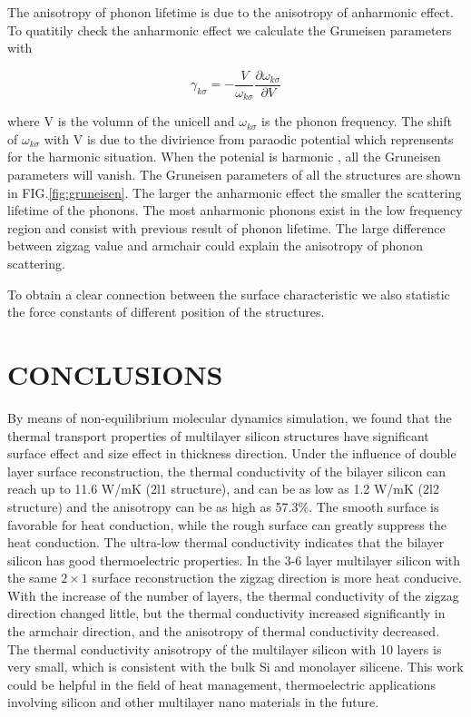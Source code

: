 \documentclass[%
 reprint,
 amsmath,amssymb,
 aps,
 prb,
]{revtex4-1}
\begin{document}
The anisotropy of phonon lifetime is due to the anisotropy of anharmonic effect. To quatitily check the anharmonic effect we calculate the Gruneisen parameters with

\begin{equation}
  \gamma_{k \sigma}=- \frac{V}{\omega_{k \sigma}} \frac{\partial \omega_{k \sigma}}{\partial V}
\end{equation}

where V is the volumn of the unicell and $\omega_{k \sigma}$ is the phonon frequency. The shift of $\omega_{k \sigma}$ with V is due to the divirience from paraodic potential which reprensents for the harmonic situation. When the potenial is harmonic , all the Gruneisen parameters will vanish.
The Gruneisen parameters of all the structures are shown in FIG.\ref{fig:gruneisen}. The larger the anharmonic effect the smaller the scattering lifetime of the phonons. The most anharmonic phonons exist in the low frequency region and consist with previous result of phonon lifetime. The large difference between zigzag value and armchair could explain the anisotropy of phonon scattering.

To obtain a clear connection between  the surface characteristic we also statistic the force constants of different position of the structures.



\section{CONCLUSIONS}

By means of non-equilibrium molecular dynamics simulation, we found that the thermal transport properties of multilayer silicon structures have significant surface effect and size effect in thickness direction. Under the influence of double layer surface reconstruction, the thermal conductivity of the bilayer silicon can reach up to 11.6 W/mK (2l1 structure), and can be as low as 1.2 W/mK (2l2 structure) and the anisotropy can be as high as 57.3\%. The smooth surface is favorable for heat conduction, while the rough surface can greatly suppress the heat conduction. The ultra-low thermal conductivity indicates that the bilayer silicon has good thermoelectric properties. In the 3-6 layer multilayer silicon with the same $2 \times 1$ surface reconstruction the zigzag direction is more heat conducive. With the increase of the number of layers, the thermal conductivity of the zigzag direction changed little, but the thermal conductivity increased significantly in the armchair direction, and the anisotropy of thermal conductivity decreased. The thermal conductivity anisotropy of the multilayer silicon with 10 layers is very small, which is consistent with the bulk Si and monolayer silicene. This work could be helpful in the field of heat management, thermoelectric applications involving silicon and other multilayer nano materials in the future.
\end{document}
